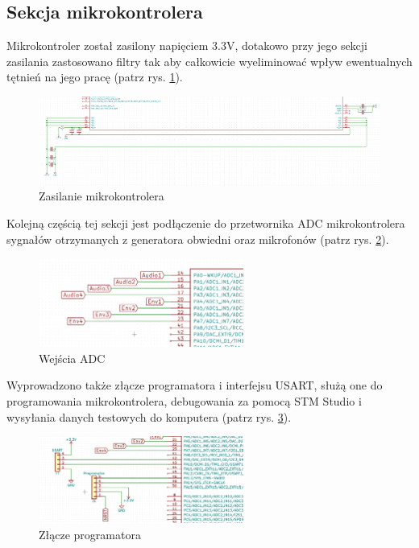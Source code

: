 \documentclass[eng,printmode]{mgr}
\begin{document}
\subsection{Sekcja mikrokontrolera}
Mikrokontroler został zasilony napięciem 3.3V, dotakowo przy jego sekcji zasilania zastosowano filtry tak aby całkowicie wyeliminować wpływ ewentualnych tętnień na jego pracę (patrz rys. \ref{fig-filtry}).
\begin{figure}[ht]

    \centering

  \includegraphics[width=1.1\textwidth, angle=0]{filtry.png}

    \caption{Zasilanie mikrokontrolera}
 \label{fig-filtry}
    

\end{figure}

Kolejną częścią tej sekcji jest podłączenie do przetwornika ADC mikrokontrolera sygnałów otrzymanych z generatora obwiedni oraz mikrofonów (patrz rys. \ref{fig-adc}).
\begin{figure}[ht]

    \centering

  \includegraphics[width=0.6\textwidth, angle=0]{podlaczenie.png}

    \caption{Wejścia ADC}
 \label{fig-adc}
    

\end{figure}

Wyprowadzono także złącze programatora i interfejsu USART, służą one do programowania mikrokontrolera, debugowania za pomocą STM Studio i wysyłania danych testowych do komputera  (patrz rys. \ref{fig-programator}).
\begin{figure}[ht]

    \centering

  \includegraphics[width=0.6\textwidth, angle=0]{usart.png}

    \caption{Złącze programatora}
 \label{fig-programator}
    

\end{figure}
\end{document}
